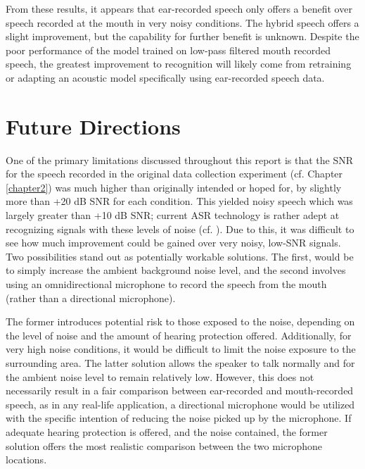 From these results, it appears that ear-recorded speech only offers a benefit over speech recorded at the mouth in very noisy conditions.  The hybrid speech offers a slight improvement, but the capability for further benefit is unknown.  Despite the poor performance of the model trained on low-pass filtered mouth recorded speech, the greatest improvement to recognition will likely come from retraining or adapting an acoustic model specifically using ear-recorded speech data.


\section{Future Directions}\label{chap5:future-research}

One of the primary limitations discussed throughout this report is that the SNR for the speech recorded in the original data collection experiment (cf. Chapter \ref{chapter2}) was much higher than originally intended or hoped for, by slightly more than +20 dB SNR for each condition.  This yielded noisy speech which was largely greater than +10 dB SNR; current ASR technology is rather adept at recognizing signals with these levels of noise (cf. \cite{braun:16}).  Due to this, it was difficult to see how much improvement could be gained over very noisy, low-SNR signals.  Two possibilities stand out as potentially workable solutions.  The first, would be to simply increase the ambient background noise level, and the second involves using an omnidirectional microphone to record the speech from the mouth (rather than a directional microphone).  

The former introduces potential risk to those exposed to the noise, depending on the level of noise and the amount of hearing protection offered.  Additionally, for very high noise conditions, it would be difficult to limit the noise exposure to the surrounding area.  The latter solution allows the speaker to talk normally and for the ambient noise level to remain relatively low.  However, this does not necessarily result in a fair comparison between ear-recorded and mouth-recorded speech, as in any real-life application, a directional microphone would be utilized with the specific intention of reducing the noise picked up by the microphone.  If adequate hearing protection is offered, and the noise contained, the former solution offers the most realistic comparison between the two microphone locations.

